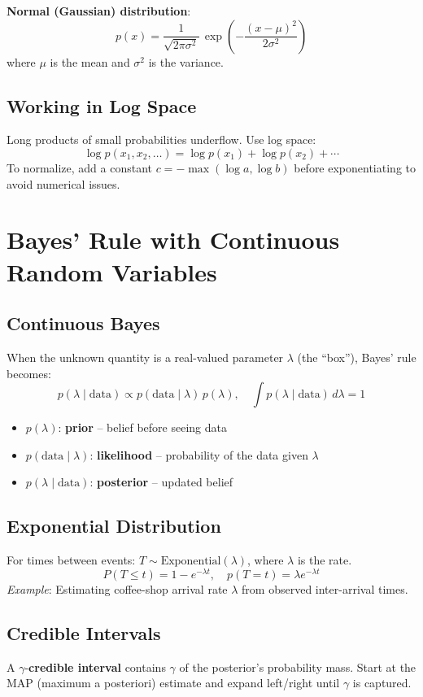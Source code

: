 \documentclass[11pt]{article}
\begin{document}
\textbf{Normal (Gaussian) distribution}:
\[
  p(x) = \frac{1}{\sqrt{2\pi\sigma^2}}\,\exp\!\left(-\frac{(x-\mu)^2}{2\sigma^2}\right)
\]
where $\mu$ is the mean and $\sigma^2$ is the variance.

\subsection{Working in Log Space}
Long products of small probabilities underflow. Use log space:
\[
  \log p(x_1, x_2, \ldots) = \log p(x_1) + \log p(x_2) + \cdots
\]
To normalize, add a constant $c = -\max(\log a, \log b)$ before exponentiating to avoid numerical issues.

\section{Bayes' Rule with Continuous Random Variables}

\subsection{Continuous Bayes}
When the unknown quantity is a real-valued parameter $\lambda$ (the ``box''), Bayes' rule becomes:
\[
  p(\lambda \mid \text{data}) \propto p(\text{data} \mid \lambda)\,p(\lambda),
  \quad \int p(\lambda \mid \text{data})\,d\lambda = 1
\]
\begin{itemize}
  \item $p(\lambda)$: \textbf{prior} -- belief before seeing data
  \item $p(\text{data} \mid \lambda)$: \textbf{likelihood} -- probability of the data given $\lambda$
  \item $p(\lambda \mid \text{data})$: \textbf{posterior} -- updated belief
\end{itemize}

\subsection{Exponential Distribution}
For times between events: $T \sim \text{Exponential}(\lambda)$, where $\lambda$ is the rate.
\[
  P(T \leq t) = 1 - e^{-\lambda t}, \quad p(T=t) = \lambda e^{-\lambda t}
\]
\textit{Example}: Estimating coffee-shop arrival rate $\lambda$ from observed inter-arrival times.

\subsection{Credible Intervals}
A $\gamma$-\textbf{credible interval} contains $\gamma$ of the posterior's probability mass. Start at the MAP (maximum a posteriori) estimate and expand left/right until $\gamma$ is captured.
\end{document}
